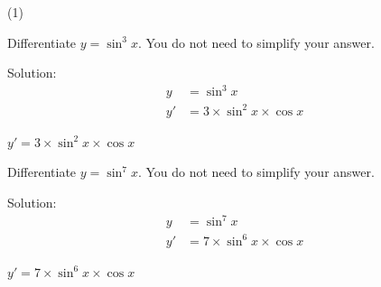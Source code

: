 \begin{mtask}(1)
   \task \begin{exercise} Differentiate $y=\sin^3x$. You do not need to simplify your answer.\\
             \begin{envSolution}
			      Solution:
			      \begin{align*}
			           y & =\sin^3x                             \\[20pt]
                       y' & =3 \times \sin^2 x \times \cos x   
				 \end{align*}
                 \begin{shortsolution}  
				       $y'  =3 \times \sin^2 x \times \cos x$
			     \end{shortsolution}				 
               \end{envSolution}
         \end{exercise}

   \task \begin{exercise} Differentiate $y=\sin^7x$. You do not need to simplify your answer.\\
             \begin{envSolution}
			      Solution:
			      \begin{align*}
			           y & =\sin^7x                             \\[20pt]
                       y' & =7 \times \sin^6 x \times \cos x   
				 \end{align*}
                 \begin{shortsolution}  
				       $y'  =7 \times \sin^6 x \times \cos x$
			     \end{shortsolution}				 
               \end{envSolution}
         \end{exercise}


\end{mtask}
